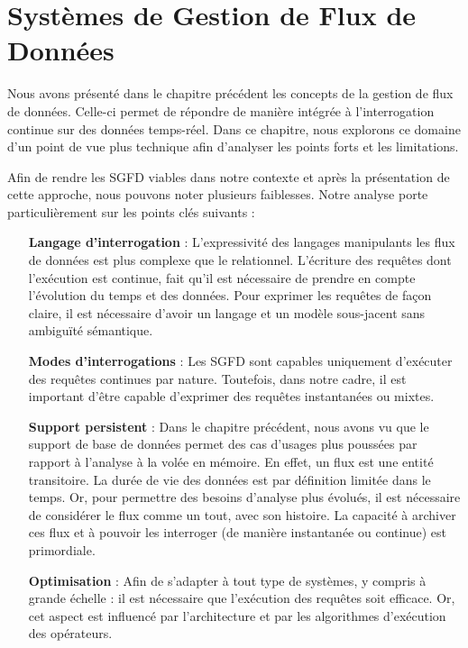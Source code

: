 
\chapter{Systèmes de Gestion de Flux de Données}\label{chap:rw:sgfd}
\chaptertoc
Nous avons présenté dans le chapitre précédent les concepts de la gestion de flux de données. Celle-ci permet de répondre de manière intégrée à l'interrogation continue sur des données temps-réel. Dans ce chapitre, nous explorons ce domaine d'un point de vue plus technique afin d'analyser les points forts et les limitations.

Afin de rendre les SGFD viables dans notre contexte et après la présentation de cette approche, nous pouvons noter plusieurs faiblesses. Notre analyse porte particulièrement sur les points clés suivants : 
\begin{itemize}
	\item[\textbf{Langage d'interrogation}] : L'expressivité des langages manipulants les flux de données est plus complexe que le relationnel. L'écriture des requêtes dont l'exécution est continue, fait qu'il est nécessaire de prendre en compte l'évolution du temps et des données. Pour exprimer les requêtes de façon claire, il est nécessaire d'avoir un langage et un modèle sous-jacent sans ambiguïté sémantique.
	\item[\textbf{Modes d'interrogations}] : Les SGFD sont capables uniquement d'exécuter des requêtes continues par nature. Toutefois, dans notre cadre, il est important d'être capable d'exprimer des requêtes instantanées ou mixtes. 
	\item[\textbf{Support persistent}] : Dans le chapitre précédent, nous avons vu que le support de base de données permet des cas d'usages plus poussées par rapport à l'analyse à la volée en mémoire. En effet, un flux est une entité transitoire. La durée de vie des données est par définition limitée dans le temps. Or, pour permettre des besoins d'analyse plus évolués, il est nécessaire de considérer le flux comme un tout, avec son histoire. La capacité à archiver ces flux et à pouvoir les interroger (de manière instantanée ou continue) est primordiale.
	\item[\textbf{Optimisation}] : Afin de s'adapter à tout type de systèmes, y compris à grande échelle : il est nécessaire que l'exécution des requêtes soit efficace. Or, cet aspect est influencé par l'architecture et par les algorithmes d'exécution des opérateurs.
\end{itemize}

